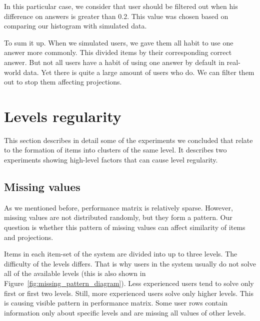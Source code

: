 \documentclass[
  printed, %
  table,   %
  nolof,     %
  nolot,     %
  color,
  final,
  nocover
]{fithesis3}
\begin{document}
In this particular case, we consider that user should be filtered out when his difference on answers is greater than 0.2. This value was chosen based on comparing our histogram with simulated data.


To sum it up. When we simulated users, we gave them all habit to use one answer more commonly. This divided items by their corresponding correct answer. But not all users have a habit of using one answer by default in real-world data. Yet there is quite a large amount of users who do. We can filter them out to stop them affecting projections.


\section{Levels regularity}\label{evaulation-levels-regularity}

This section describes in detail some of the experiments we concluded that relate to the formation of items into clusters of the same level. It describes two experiments showing high-level factors that can cause level regularity.


\subsection{Missing values}\label{missing-values}


As we mentioned before, performance matrix is relatively sparse. However, missing values are not distributed randomly, but they form a pattern. Our question is whether this pattern of missing values can affect similarity of items and projections.


Items in each item-set of the system are divided into up to three levels. The difficulty of the levels differs. That is why users in the system usually do not solve all of the available levels (this is also shown in Figure~\ref{fig:missing_pattern_diagram}). Less experienced users tend to solve only first or first two levels. Still, more experienced users solve only higher levels. This is causing visible pattern in performance matrix. Some user rows contain information only about specific levels and are missing all values of other levels.
\end{document}
